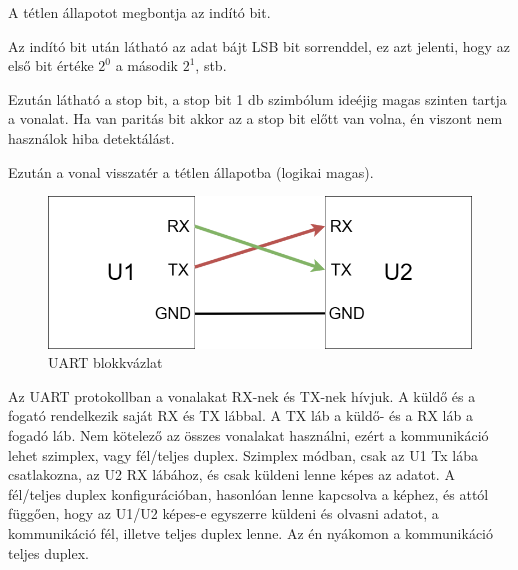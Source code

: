 \documentclass[a4paper,12pt,oneside]{book}
\begin{document}
A tétlen állapotot megbontja az indító bit.

Az indító bit után látható az adat bájt LSB bit sorrenddel, ez azt jelenti, hogy az első bit értéke $2^0$ a második $2^1$, stb. 

Ezután látható a stop bit, a stop bit 1 db szimbólum ideéjig magas szinten tartja a vonalat. Ha van paritás bit akkor az a stop bit előtt van volna, én viszont nem használok hiba detektálást.

Ezután a vonal visszatér a tétlen állapotba (logikai magas).
\begin{figure}[H]
	\centering
	\includegraphics[trim=1mm 1mm 1mm 1mm,scale=0.55]{uartblock.png}
	\caption{UART blokkvázlat}
	\label{UARTblockk}
\end{figure}
Az UART protokollban a vonalakat RX-nek és TX-nek hívjuk. A küldő és a fogató rendelkezik saját RX és TX lábbal. A TX láb a küldő- és a RX láb a fogadó láb. Nem kötelező az összes vonalakat használni, ezért a kommunikáció lehet szimplex, vagy fél/teljes duplex. Szimplex módban, csak az U1 Tx lába csatlakozna, az U2 RX lábához, és csak küldeni lenne képes az adatot. A fél/teljes duplex konfigurációban, hasonlóan lenne kapcsolva a képhez, és attól függően, hogy az U1/U2 képes-e egyszerre küldeni és olvasni adatot, a kommunikáció fél, illetve teljes duplex lenne. Az én nyákomon a kommunikáció teljes duplex.
\end{document}
